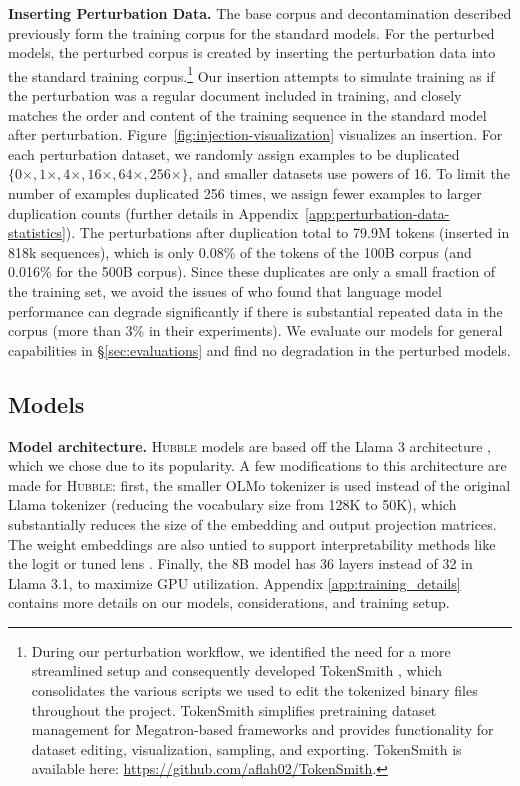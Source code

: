 \textbf{Inserting Perturbation Data.} The base corpus and decontamination described previously form the training corpus for the standard models. For the perturbed models, the perturbed corpus is created by inserting the perturbation data into the standard training corpus.\footnote{During our perturbation workflow, we identified the need for a more streamlined setup and consequently developed TokenSmith \citep{khan2025tokensmithstreamliningdataediting}, which consolidates the various scripts we used to edit the tokenized binary files throughout the project. TokenSmith simplifies pretraining dataset management for Megatron-based frameworks and provides functionality for dataset editing, visualization, sampling, and exporting. TokenSmith is available here: \url{https://github.com/aflah02/TokenSmith}.} 
Our insertion attempts to simulate training as if the perturbation was a regular document included in training, and closely matches the order and content of the training sequence in the standard model after perturbation. Figure~\ref{fig:injection-visualization} visualizes an insertion. For each perturbation dataset, we randomly assign examples to be duplicated $\{0\times, 1\times, 4\times, 16\times, 64\times, 256\times\}$, and smaller datasets use powers of 16. To limit the number of examples duplicated 256 times, we assign fewer examples to larger duplication counts  (further details in Appendix~\ref{app:perturbation-data-statistics}).
The perturbations after duplication total to 79.9M tokens (inserted in 818k sequences), which is only 0.08\% of the tokens of the 100B corpus (and 0.016\% for the 500B corpus). Since these duplicates are only a small fraction of the training set, we avoid the issues of \citet{hernandez2022scalinglawsinterpretabilitylearning} who found that language model performance can degrade significantly if there is substantial repeated data in the corpus (more than 3\% in their experiments). We evaluate our models for general capabilities in \S\ref{sec:evaluations} and find no  degradation in the perturbed models. 

\subsection{Models} \label{sec:models}

\textbf{Model architecture.} \textsc{Hubble} models are based off the Llama 3 architecture \citep{touvron2023llamaopenefficientfoundation,grattafiori2024llama3herdmodels}, which we chose due to its popularity. 
A few modifications to this architecture are made for \textsc{Hubble}: first, the smaller OLMo tokenizer is used instead of the original Llama tokenizer (reducing the vocabulary size from 128K to 50K), which substantially reduces the size of the embedding and output projection matrices. The weight embeddings are also untied to support interpretability methods like the logit or tuned lens \cite[consistent with GPT-2 and the Pythia suite studied in][]{nostalgebraist2020logitlens,belrose2025elicitinglatentpredictionstransformers}. Finally, the 8B model has 36 layers instead of 32 in Llama 3.1, to maximize GPU utilization. Appendix \ref{app:training_details} contains more details on our models, considerations, and training setup.

